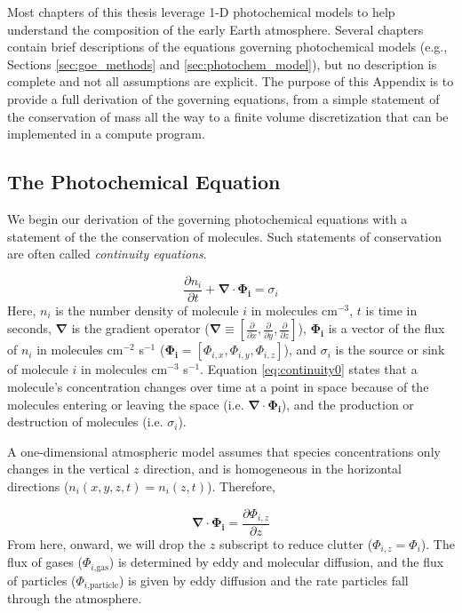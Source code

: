 
Most chapters of this thesis leverage 1-D photochemical models to help understand the composition of the early Earth atmosphere. Several chapters contain brief descriptions of the equations governing photochemical models (e.g., Sections \ref{sec:goe_methods} and \ref{sec:photochem_model}), but no description is complete and not all assumptions are explicit. The purpose of this Appendix is to provide a full derivation of the governing equations, from a simple statement of the conservation of mass all the way to a finite volume discretization that can be implemented in a compute program.

\subsection{The Photochemical Equation} \label{sec:photochem_eqn}

We begin our derivation of the governing photochemical equations with a statement of the the conservation of molecules. Such statements of conservation are often called \emph{continuity equations}.

\begin{equation} \label{eq:continuity0}
  \frac{\partial n_{i}}{\partial t} + \bm{\nabla} \cdot \bm{\Phi_{i}} = \sigma_i
\end{equation}
Here, $n_i$ is the number density of molecule $i$ in molecules cm$^{-3}$, $t$ is time in seconds, $\bm{\nabla}$ is the gradient operator ($\bm{\nabla} \equiv [\frac{\partial}{\partial x}, \frac{\partial}{\partial y}, \frac{\partial}{\partial z}]$), $\bm{\Phi_{i}}$ is a vector of the flux of $n_i$ in molecules cm$^{-2}$ s$^{-1}$ ($\bm{\Phi_{i}} = [\Phi_{i,x},\Phi_{i,y},\Phi_{i,z}]$), and $\sigma_i$ is the source or sink of molecule $i$ in molecules cm$^{-3}$ s$^{-1}$. Equation \eqref{eq:continuity0} states that a molecule's concentration changes over time at a point in space because of the molecules entering or leaving the space (i.e. $\bm{\nabla} \cdot \bm{\Phi_{i}}$), and the production or destruction of molecules (i.e. $\sigma_i$). 

A one-dimensional atmospheric model assumes that species concentrations only changes in the vertical $z$ direction, and is homogeneous in the horizontal directions ($n_i(x,y,z,t) = n_i(z,t)$). Therefore,

\begin{equation} \label{eq:1D_flux}
  \bm{\nabla} \cdot \bm{\Phi_{i}} = \frac{\partial \Phi_{i,z}}{\partial z}
\end{equation}
From here, onward, we will drop the $z$ subscript to reduce clutter ($\Phi_{i,z} = \Phi_{i}$). The flux of gases ($\Phi_{i\text{,gas}}$) is determined by eddy and molecular diffusion, and the flux of particles ($\Phi_{i\text{,particle}}$) is given by eddy diffusion and the rate particles fall through the atmosphere.


